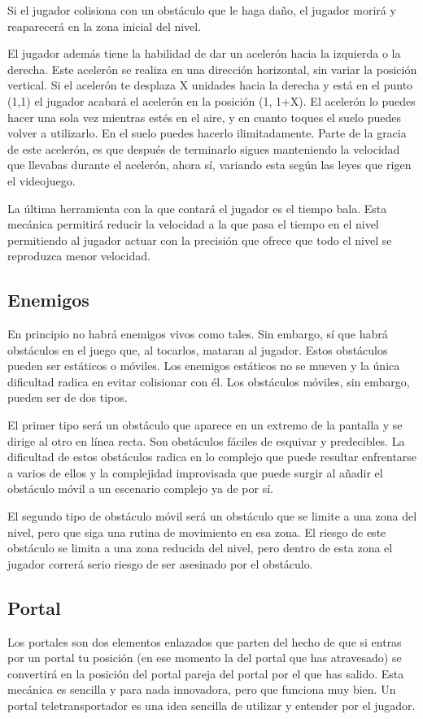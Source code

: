 Si el jugador colisiona con un obstáculo que le haga daño, el jugador morirá y reaparecerá en la zona inicial del nivel.

El jugador además tiene la habilidad de dar un acelerón hacia la izquierda o la derecha. Este acelerón se realiza en una dirección horizontal, sin variar la posición vertical. Si el acelerón te desplaza X unidades hacia la derecha y está en el punto (1,1) el jugador acabará el acelerón en la posición (1, 1+X). El acelerón lo puedes hacer una sola vez mientras estés en el aire, y en cuanto toques el suelo puedes volver a utilizarlo. En el suelo puedes hacerlo ilimitadamente. Parte de la gracia de este acelerón, es que después de terminarlo sigues manteniendo la velocidad que llevabas durante el acelerón, ahora sí, variando esta según las leyes que rigen el videojuego.

La última herramienta con la que contará el jugador es el tiempo bala. Esta mecánica permitirá reducir la velocidad a la que pasa el tiempo en el nivel permitiendo al jugador actuar con la precisión que ofrece que todo el nivel se reproduzca menor velocidad.

\subsection{Enemigos}
En principio no habrá enemigos vivos como tales. Sin embargo, sí que habrá obstáculos en el juego que, al tocarlos, mataran al jugador. Estos obstáculos pueden ser estáticos o móviles. Los enemigos estáticos no se mueven y la única dificultad radica en evitar colisionar con él. Los obstáculos móviles, sin embargo, pueden ser de dos tipos.

El primer tipo será un obstáculo que aparece en un extremo de la pantalla y se dirige al otro en línea recta. Son obstáculos fáciles de esquivar y predecibles. La dificultad de estos obstáculos radica en lo complejo que puede resultar enfrentarse a varios de ellos y la complejidad improvisada que puede surgir al añadir el obstáculo móvil a un escenario complejo ya de por sí.

El segundo tipo de obstáculo móvil será un obstáculo que se limite a una zona del nivel, pero que siga una rutina de movimiento en esa zona. El riesgo de este obstáculo se limita a una zona reducida del nivel, pero dentro de esta zona el jugador correrá serio riesgo de ser asesinado por el obstáculo.

\subsection{Portal}
Los portales son dos elementos enlazados que parten del hecho de que si entras por un portal tu posición (en ese momento la del portal que has atravesado) se convertirá en la posición del portal pareja del portal por el que has salido. Esta mecánica es sencilla y para nada innovadora, pero que funciona muy bien. Un portal teletransportador es una idea sencilla de utilizar y entender por el jugador.

